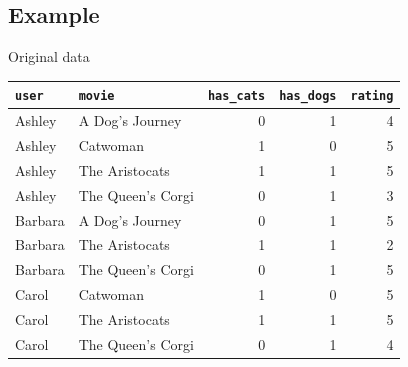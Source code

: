 \documentclass[12pt,aspectratio=169]{beamer}
\begin{document}
\subsection{Example}

\begin{frame}{Original data}
    \centering
    \begin{tabular}{llrrr}
        \toprule
        \texttt{user} & \texttt{movie}    & \texttt{has\_cats} & \texttt{has\_dogs} & \texttt{rating} \\
        \midrule
        Ashley        & A Dog's Journey   & 0                  & 1                  & 4               \\
        Ashley        & Catwoman          & 1                  & 0                  & 5               \\
        Ashley        & The Aristocats    & 1                  & 1                  & 5               \\
        Ashley        & The Queen's Corgi & 0                  & 1                  & 3               \\
        Barbara       & A Dog's Journey   & 0                  & 1                  & 5               \\
        Barbara       & The Aristocats    & 1                  & 1                  & 2               \\
        Barbara       & The Queen's Corgi & 0                  & 1                  & 5               \\
        Carol         & Catwoman          & 1                  & 0                  & 5               \\
        Carol         & The Aristocats    & 1                  & 1                  & 5               \\
        Carol         & The Queen's Corgi & 0                  & 1                  & 4               \\
        \bottomrule
    \end{tabular}
\end{frame}
\end{document}
